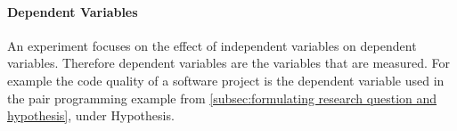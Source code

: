 
\paragraph{Dependent Variables}

An experiment focuses on the effect of independent variables on dependent variables. Therefore dependent variables are the variables that are measured. For example the code quality of a software project is the dependent variable used in the pair programming example from \ref{subsec:formulating research question and hypothesis}, under Hypothesis.

